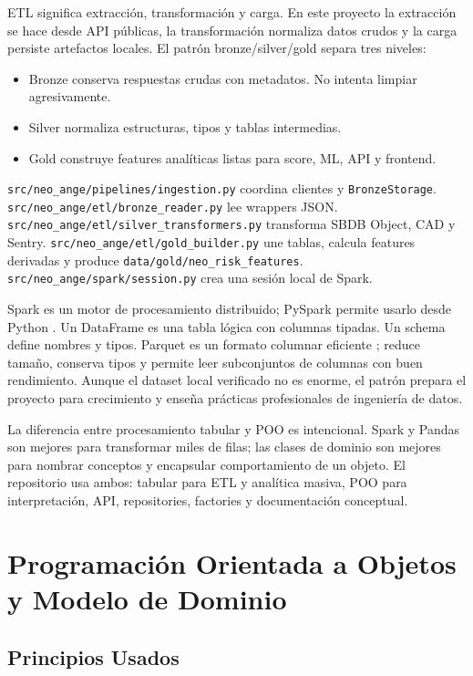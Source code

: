 \documentclass[12pt,a4paper]{report}
\newcommand{\code}[1]{\texttt{#1}}
\DeclareRobustCommand{\filepath}[1]{\nolinkurl{#1}}
\begin{document}
ETL significa extracción, transformación y carga. En este proyecto la extracción se hace desde API públicas, la transformación normaliza datos crudos y la carga persiste artefactos locales. El patrón bronze/silver/gold separa tres niveles:

\begin{itemize}
  \item Bronze conserva respuestas crudas con metadatos. No intenta limpiar agresivamente.
  \item Silver normaliza estructuras, tipos y tablas intermedias.
  \item Gold construye features analíticas listas para score, ML, API y frontend.
\end{itemize}

\filepath{src/neo_ange/pipelines/ingestion.py} coordina clientes y \code{BronzeStorage}. \filepath{src/neo_ange/etl/bronze_reader.py} lee wrappers JSON. \filepath{src/neo_ange/etl/silver_transformers.py} transforma SBDB Object, CAD y Sentry. \filepath{src/neo_ange/etl/gold_builder.py} une tablas, calcula features derivadas y produce \filepath{data/gold/neo_risk_features}. \filepath{src/neo_ange/spark/session.py} crea una sesión local de Spark.

Spark es un motor de procesamiento distribuido; PySpark permite usarlo desde Python \cite{spark_docs}. Un DataFrame es una tabla lógica con columnas tipadas. Un schema define nombres y tipos. Parquet es un formato columnar eficiente \cite{parquet_docs}; reduce tamaño, conserva tipos y permite leer subconjuntos de columnas con buen rendimiento. Aunque el dataset local verificado no es enorme, el patrón prepara el proyecto para crecimiento y enseña prácticas profesionales de ingeniería de datos.

La diferencia entre procesamiento tabular y POO es intencional. Spark y Pandas son mejores para transformar miles de filas; las clases de dominio son mejores para nombrar conceptos y encapsular comportamiento de un objeto. El repositorio usa ambos: tabular para ETL y analítica masiva, POO para interpretación, API, repositories, factories y documentación conceptual.

\chapter{Programación Orientada a Objetos y Modelo de Dominio}

\section{Principios Usados}
\end{document}
